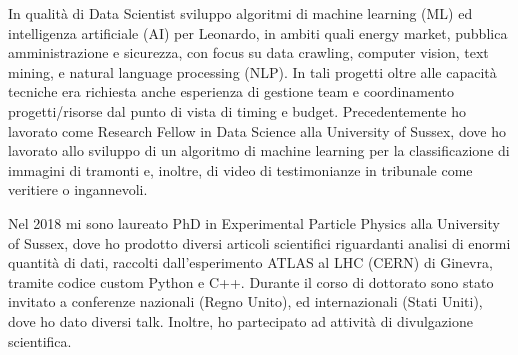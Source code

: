 	
In qualità di Data Scientist sviluppo algoritmi di machine learning (ML) ed intelligenza artificiale (AI) per Leonardo, in ambiti quali energy market, pubblica amministrazione e sicurezza, con focus su data crawling, computer vision, text mining, e natural language processing (NLP). In tali progetti oltre alle capacità tecniche era richiesta anche esperienza di gestione team e coordinamento progetti/risorse dal punto di vista di timing e budget. Precedentemente ho lavorato come Research Fellow in Data Science alla University of Sussex, dove ho lavorato allo sviluppo di un algoritmo di machine learning per la classificazione di immagini di tramonti e, inoltre, di video di testimonianze in tribunale come veritiere o ingannevoli. 

Nel 2018 mi sono laureato PhD in Experimental Particle Physics alla University of Sussex, dove ho prodotto diversi articoli scientifici riguardanti analisi di enormi quantità di dati, raccolti dall'esperimento ATLAS al LHC (CERN) di Ginevra, tramite codice custom Python e C++. Durante il corso di dottorato sono stato invitato a conferenze nazionali (Regno Unito), ed internazionali (Stati Uniti), dove ho dato diversi talk. Inoltre, ho partecipato ad attività di divulgazione scientifica.
